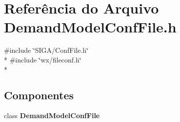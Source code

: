 \section{Referência do Arquivo Demand\+Model\+Conf\+File.\+h}
\label{_demand_model_conf_file_8h}
{\ttfamily \#include \char`\"{}S\+I\+G\+A/\+Conf\+File.\+h\char`\"{}}\\*
{\ttfamily \#include \char`\"{}wx/fileconf.\+h\char`\"{}}\\*
\subsection*{Componentes}
\begin{DoxyCompactItemize}
\item 
class {\bf Demand\+Model\+Conf\+File}
\end{DoxyCompactItemize}
